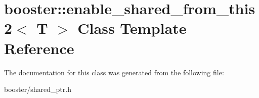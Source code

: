 \section{booster\-:\-:enable\-\_\-shared\-\_\-from\-\_\-this2$<$ T $>$ Class Template Reference}
\label{classbooster_1_1enable__shared__from__this2}


The documentation for this class was generated from the following file\-:\begin{DoxyCompactItemize}
\item 
booster/shared\-\_\-ptr.\-h\end{DoxyCompactItemize}
